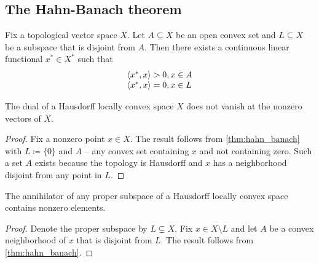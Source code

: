 \subsection{The Hahn-Banach theorem}\label{subsec:hahn_banach}

\begin{theorem}\label{thm:hahn_banach}\cite[24]{Йоффе1974}
  Fix a topological vector space \( X \). Let \( A \subseteq X \) be an open convex set and \( L \subseteq X \) be a subspace that is disjoint from \( A \). Then there exists a continuous linear functional \( x^* \in X^* \) such that
  \begin{equation*}
    \begin{array}{l}
      \left\langle x^*, x \right\rangle > 0, x \in A \\
      \left\langle x^*, x \right\rangle = 0, x \in L
    \end{array}
  \end{equation*}
\end{theorem}

\begin{corollary}\label{thm:hahn_banach_functionals_vanish_nowhere}\cite[24]{Йоффе1974}
  The dual of a Hausdorff locally convex space \( X \) does not vanish at the nonzero vectors of \( X \).
\end{corollary}
\begin{proof}
  Fix a nonzero point \( x \in X \). The result follows from \cref{thm:hahn_banach} with \( L \coloneqq \{ 0 \} \) and \( A \) -- any convex set containing \( x \) and not containing zero. Such a set \( A \) exists because the topology is Hausdorff and \( x \) has a neighborhood disjoint from any point in \( L \).
\end{proof}

\begin{corollary}\label{thm:hahn_banach_annihilator_nontrivial}\cite[25]{Йоффе1974}
  The annihilator of any proper subspace of a Hausdorff locally convex space contains nonzero elements.
\end{corollary}
\begin{proof}
  Denote the proper subspace by \( L \subsetneq X \). Fix \( x \in X \setminus L \) and let \( A \) be a convex neighborhood of \( x \) that is disjoint from \( L \). The result follows from \cref{thm:hahn_banach}.
\end{proof}

